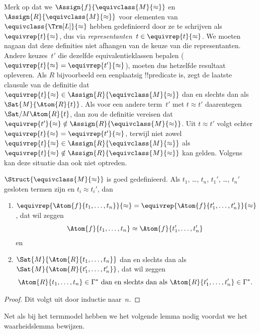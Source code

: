 \documentclass[../../../include/open-logic-section]{subfiles}
\begin{document}
\begin{explain}
Merk op dat we $\Assign{f}{\equivclass{M}{\approx}}$ en
$\Assign{R}{\equivclass{M}{\approx}}$ voor elementen van
$\equivclass{\Trm[L]}{\approx}$ hebben gedefinieerd door ze te schrijven
als $\equivrep{t}{\approx}$, dus via \emph{representanten}~$t \in
\equivrep{t}{\approx}$. We moeten nagaan dat deze definities niet afhangen
van de keuze van die representanten. Andere keuzes~$t'$ die dezelfde
equivalentieklassen bepalen
($\equivrep{t}{\approx} = \equivrep{t'}{\approx}$), moeten dus hetzelfde
resultaat opleveren. Als $R$ bijvoorbeeld een eenplaatsig !!{predicate}
is, zegt de laatste clausule van de definitie dat
$\equivrep{t}{\approx} \in \Assign{R}{\equivclass{M}{\approx}}$ dan en
slechts dan als $\Sat{M}{\Atom{R}{t}}$. Als voor een andere term~$t'$ met
$t \approx t'$ daarentegen $\Sat/{M}{\Atom{R}{t}}$, dan zou de definitie
vereisen dat $\equivrep{t'}{\approx} \notin
\Assign{R}{\equivclass{M}{\approx}}$. Uit $t \approx t'$ volgt echter
$\equivrep{t}{\approx} = \equivrep{t'}{\approx}$, terwijl niet zowel
$\equivrep{t}{\approx} \in \Assign{R}{\equivclass{M}{\approx}}$ als
$\equivrep{t}{\approx} \notin \Assign{R}{\equivclass{M}{\approx}}$ kan
gelden. Volgens  kan deze situatie dan ook niet
optreden.
\end{explain}

\begin{prop}
$\Struct{\equivclass{M}{\approx}}$ is goed gedefinieerd. Als $t_1$,
  \dots, $t_n$, $t_1'$, \dots, $t_n'$ gesloten termen zijn en
  $t_i \approx t_i'$, dan
\begin{enumerate}
\item $\equivrep{\Atom{f}{t_1,\dots, t_n}}{\approx} =
    \equivrep{\Atom{f}{t_1',\dots, t_n'}}{\approx}$, dat wil zeggen
  \[
  \Atom{f}{t_1,\dots, t_n} \approx \Atom{f}{t_1',\dots, t_n'}
  \]
  en
\item $\Sat{M}{\Atom{R}{t_1,\dots, t_n}}$ dan en slechts dan als
  $\Sat{M}{\Atom{R}{t_1',\dots, t_n'}}$, dat wil zeggen
  \[
    \Atom{R}{t_1,\dots, t_n} \in \Gamma^* \text{ dan en slechts dan als }
    \Atom{R}{t_1',\dots, t_n'} \in \Gamma^*.
  \]
\end{enumerate}
\end{prop}

\begin{proof}
Dit volgt uit  door inductie naar~$n$.
\end{proof}

Net als bij het termmodel hebben we het volgende lemma nodig voordat we het
waarheidslemma bewijzen.
\end{document}
